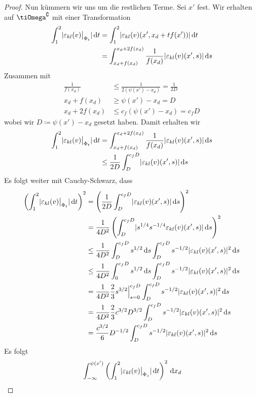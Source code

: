 \documentclass{scrartcl}
\def\e{\varepsilon}
\newcommand{\dif}[1]{\,\mathrm{d} #1}
\DeclarePairedDelimiter{\abs}{|}{|}
\begin{document}
\begin{proof}
	Nun kümmern wir uns um die restlichen Terme. Sei $x'$ fest. Wir erhalten auf $\tiOmega^\complement$ mit einer Transformation
	\begin{align*}
		\int_1^2\abs{\e_{kl}(v)\big\vert_{\Phi_t}}\dif t
		&= \int_1^2\abs{\e_{kl}(v)(x',x_d+tf(x'))}\dif t \\
		&= \int_{x_d+f(x_d)}^{x_d+2f(x_d)}\frac{1}{f(x_d)}\abs{\e_{kl}(v)(x',s)}\dif s
	\end{align*}
	Zusammen mit
	\begin{align*}
		\frac{1}{f(x_d)}&\leq\frac{1}{2(\psi(x')-x_d)} = \frac{1}{2D} \\
		x_d+f(x_d)&\geq\psi(x')-x_d = D \\
		x_d+2f(x_d)&\leq c_f(\psi(x')-x_d) = c_fD
	\end{align*}
	wobei wir $D\coloneqq\psi(x')-x_d$ gesetzt haben. Damit erhalten wir
	\begin{align*}
		\int_1^2\abs{\e_{kl}(v)\big\vert_{\Phi_t}}\dif t
		&= \int_{x_d+f(x_d)}^{x_d+2f(x_d)}\frac{1}{f(x_d)}\abs{\e_{kl}(v)(x',s)}\dif s \\		
		&\leq \frac{1}{2D}\int_{D}^{c_fD}\abs{\e_{kl}(v)(x',s)}\dif s \\
	\end{align*}
	Es folgt weiter mit Cauchy-Schwarz, dass
	\begin{align*}
		\left(\int_1^2\abs{\e_{kl}(v)\big\vert_{\Phi_t}}\dif t\right)^2
		&= \left(\frac{1}{2D}\int_{D}^{c_fD}\abs{\e_{kl}(v)(x',s)}\dif s\right)^2 \\
		&= \frac{1}{4D^2}\left(\int_{D}^{c_fD}\abs{s^{1/4}s^{-1/4}\e_{kl}(v)(x',s)}\dif s\right)^2 \\
		&\leq \frac{1}{4D^2}\int_{D}^{c_fD}s^{1/2}\dif s \int_{D}^{c_fD}s^{-1/2}\abs{\e_{kl}(v)(x',s)}^2\dif s \\
		&\leq \frac{1}{4D^2}\int_{0}^{c_fD}s^{1/2}\dif s \int_{D}^{c_fD}s^{-1/2}\abs{\e_{kl}(v)(x',s)}^2\dif s \\
		&= \frac{1}{4D^2}\frac{2}{3}s^{3/2}\Big\vert_{s=0}^{c_fD}\int_{D}^{c_fD}s^{-1/2}\abs{\e_{kl}(v)(x',s)}^2\dif s \\
		&= \frac{1}{4D^2}\frac{2}{3}c^{3/2}D^{3/2}\int_{D}^{c_fD}s^{-1/2}\abs{\e_{kl}(v)(x',s)}^2\dif s \\
		&= \frac{c^{3/2}}{6}D^{-1/2}\int_{D}^{c_fD}s^{-1/2}\abs{\e_{kl}(v)(x',s)}^2\dif s
	\end{align*}
	Es folgt
	\begin{align*}
		&\int_{-\infty}^{\psi(x')}\left(\int_1^2\abs{\e_{kl}(v)\big\vert_{\Phi_s}}\dif t\right)^2\dif x_d \\

\end{align*}
\end{proof}
\end{document}

